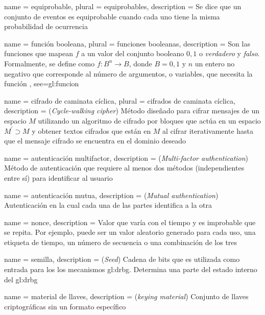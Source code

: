 {
  name = equiprobable,
  plural = equiprobables,
  description = {
    Se dice que un conjunto de eventos es equiprobable cuando cada uno tiene 
    la misma probabilidad de ocurrencia%
  }
}

{
  name = función booleana,
  plural = funciones booleanas,
  description = {
    Son las funciones que mapean $f$ a un valor del conjunto booleano ${0,1}$ o
    \textit{verdadero} y \textit{falso}.
    Formalmente, se define como $f: B^n \rightarrow B$, donde $B={0,1}$
    y $n$ un entero no negativo que corresponde al número de argumentos,
    o variables, que necesita la función%
  },
  see={gl:funcion}
}

{
  name = cifrado de caminata cíclica,
  plural = cifrados de caminata cíclica,
  description = {
    (\textit{Cycle-walking cipher}) Método diseñado para cifrar mensajes de un
    espacio $M$ utilizando un algoritmo de cifrado por bloques que actúa en un
    espacio $M^\prime \supset M$ y obtener textos cifrados que están en $M$ al
    cifrar iterativamente hasta que el mensaje cifrado se encuentra en el
    dominio deseado%
  }
}

{
  name = autenticación multifactor,
  description = {
    (\textit{Multi-factor authentication}) Método de autenticación que requiere
    al menos dos métodos (independientes entre sí) para identificar al usuario%
  }
}

{
  name = autenticación mutua,
  description = {
    (\textit{Mutual authentication}) Autenticación en la cual cada una de
    las partes identifica a la otra%
  }
}

{
  name = nonce,
  description = {
    Valor que varía con el tiempo y es improbable que se repita. Por ejemplo,
    puede ser un valor aleatorio generado para cada uso, una etiqueta de tiempo,
    un número de secuencia o una combinación de los tres%
  }
}

{
  name = semilla,
  description = {
    (\textit{Seed}) Cadena de bits que es utilizada como entrada para los
    los mecanismos \gls{gl:drbg}. Determina una parte del estado interno
    del \gls{gl:drbg}%
  }
}

{
  name = material de llaves,
  description = {(\textit{keying material})
    Conjunto de llaves criptográficas sin un formato específico%
  }
}

